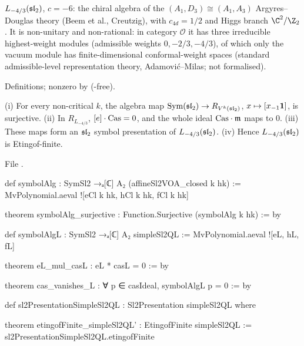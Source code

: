 \begin{physics}
$L_{-4/3}(\mathfrak{sl}_2)$, $c=-6$: the chiral algebra of the $(A_1,D_3)\cong(A_1,A_3)$ Argyres--Douglas theory (Beem et al.,
Creutzig), with $c_{4d} = 1/2$ and Higgs branch $\C^2/\Z_2$. It is non-unitary and non-rational: in category $\mathcal O$ it has
three irreducible highest-weight modules (admissible weights $0,-2/3,-4/3$), of which only the vacuum module has
finite-dimensional conformal-weight spaces (standard admissible-level representation theory, Adamovi\'c--Milas; not
formalised).
\end{physics}

\begin{status}
Definitions;  nonzero by \allowbreak{}\allowbreak{}\allowbreak{} (-free).
\end{status}

\begin{theorem}\label{l16:thm:presL}
(i) For every non-critical $k$, the algebra map $\operatorname{Sym}(\mathfrak{sl}_2)\to R_{V^k(\mathfrak{sl}_2)}$, $x\mapsto[x_{-1}\mathbf{1}]$, is
surjective. (ii) In $R_{L_{-4/3}}$, $[e]\cdot\mathrm{Cas} = 0$, and the whole ideal $\mathrm{Cas}\cdot\mathfrak m$ maps to $0$. (iii)
These maps form an $\mathfrak{sl}_2$ symbol presentation of $L_{-4/3}(\mathfrak{sl}_2)$. (iv) Hence $L_{-4/3}(\mathfrak{sl}_2)$ is
Etingof-finite.
\end{theorem}
\noindent File .
\begin{leancode}
def symbolAlg : SymSl2 →ₐ[ℂ] A₂ (affineSl2VOA_closed k hk) :=
  MvPolynomial.aeval ![eCl k hk, hCl k hk, fCl k hk]

theorem symbolAlg_surjective : Function.Surjective (symbolAlg k hk) := by

def symbolAlgL : SymSl2 →ₐ[ℂ] A₂ simpleSl2QL := MvPolynomial.aeval ![eL, hL, fL]

theorem eL_mul_casL : eL * casL = 0 := by

theorem cas_vanishes_L : ∀ p ∈ casIdeal, symbolAlgL p = 0 := by

def sl2PresentationSimpleSl2QL : Sl2Presentation simpleSl2QL where

theorem etingofFinite_simpleSl2QL' : EtingofFinite simpleSl2QL :=
  sl2PresentationSimpleSl2QL.etingofFinite
\end{leancode}

